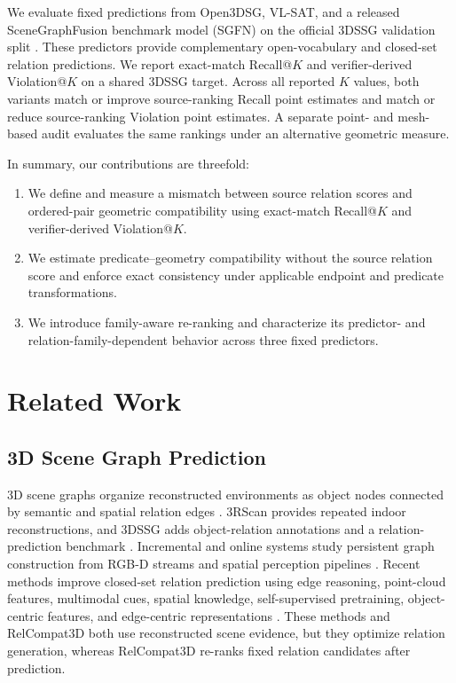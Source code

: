 We evaluate fixed predictions from Open3DSG, VL-SAT, and a released SceneGraphFusion benchmark model (SGFN) on the official 3DSSG validation split \cite{wang2023vl,koch2024open3dsg,wu2021scenegraphfusion}. These predictors provide complementary open-vocabulary and closed-set relation predictions. We report exact-match Recall@$K$ and verifier-derived Violation@$K$ on a shared 3DSSG target. Across all reported $K$ values, both variants match or improve source-ranking Recall point estimates and match or reduce source-ranking Violation point estimates. A separate point- and mesh-based audit evaluates the same rankings under an alternative geometric measure. 

In summary, our contributions are threefold:
\begin{enumerate}
    \item We define and measure a mismatch between source relation scores and ordered-pair geometric compatibility using exact-match Recall@$K$ and verifier-derived Violation@$K$.
    \item We estimate predicate--geometry compatibility without the source relation score and enforce exact consistency under applicable endpoint and predicate transformations.
    \item We introduce family-aware re-ranking and characterize its predictor- and relation-family-dependent behavior across three fixed predictors.
\end{enumerate}

\section{Related Work}
\subsection{3D Scene Graph Prediction}
3D scene graphs organize reconstructed environments as object nodes connected by semantic and spatial relation edges \cite{armeni20193d}.
3RScan provides repeated indoor reconstructions, and 3DSSG adds object-relation annotations and a relation-prediction benchmark \cite{wald2019rio,wald2020learning}. Incremental and online systems study persistent graph construction from RGB-D streams and spatial perception pipelines \cite{wu2021scenegraphfusion,hughes2022hydra}. Recent methods improve closed-set relation prediction using edge reasoning, point-cloud features, multimodal cues, spatial knowledge, self-supervised pretraining, object-centric features, and edge-centric representations \cite{zhang2021exploiting,feng20233d,wang2023vl,koch2024sgrec3d,heo2026object,ma2026edge}. These methods and RelCompat3D both use reconstructed scene evidence, but they optimize relation generation, whereas RelCompat3D re-ranks fixed relation candidates after prediction.

